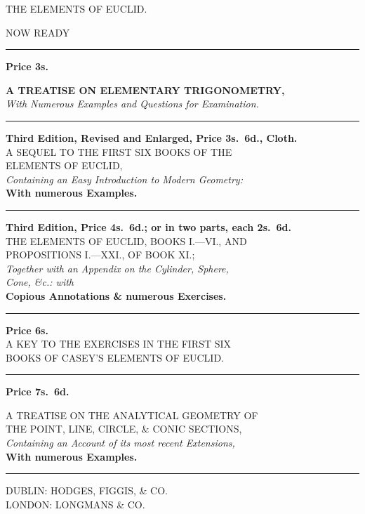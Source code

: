 \documentclass[oneside]{book}
\begin{document}
\vfill
\begin{center}
{\Large THE ELEMENTS OF EUCLID.}
\end{center}
\vfill
\newpage


\vfill

\begin{center}
{\large \textsf{NOW READY}}

\medskip
\rule{0.5in}{1pt}
\medskip

\textbf{Price 3s.}

\textbf{A TREATISE ON ELEMENTARY TRIGONOMETRY,}\\
\emph{With Numerous Examples and Questions for Examination.}


\medskip
\rule{1in}{1pt}
\medskip

{\small\textbf{Third Edition, Revised and Enlarged, Price 3s.\ 6d., Cloth.}} \\
A SEQUEL TO THE FIRST SIX BOOKS OF THE \\
ELEMENTS OF EUCLID, \\
\emph{Containing an Easy Introduction to Modern Geometry:} \\
\textbf{With numerous Examples.}

\medskip
\rule{1in}{1pt}
\medskip

{\small\textbf{Third Edition, Price 4s.\ 6d.; or in two parts, each 2s.\ 6d.}} \\
THE ELEMENTS OF EUCLID, BOOKS I.---VI\@., AND \\
PROPOSITIONS I.---XXI\@., OF BOOK XI\@.; \\
\emph{Together with an Appendix on the Cylinder, Sphere, \\
Cone, \&c.: with} \\
\textbf{Copious Annotations \& numerous Exercises.}

\medskip
\rule{1in}{1pt}
\medskip

\textbf{Price 6s.} \\
A KEY TO THE EXERCISES IN THE FIRST SIX \\
BOOKS OF CASEY'S ELEMENTS OF EUCLID.

\medskip
\rule{1in}{1pt}
\medskip

\textbf{Price 7s.\ 6d.}

A TREATISE ON THE ANALYTICAL GEOMETRY OF \\
THE POINT, LINE, CIRCLE, \& CONIC SECTIONS, \\
\emph{Containing an Account of its most recent Extensions,} \\
\textbf{With numerous Examples.}

\medskip
\rule{1in}{1pt}
\medskip

DUBLIN: HODGES, FIGGIS, \& CO. \\
LONDON: LONGMANS \& CO.
\end{center}
\vfill
\end{document}
